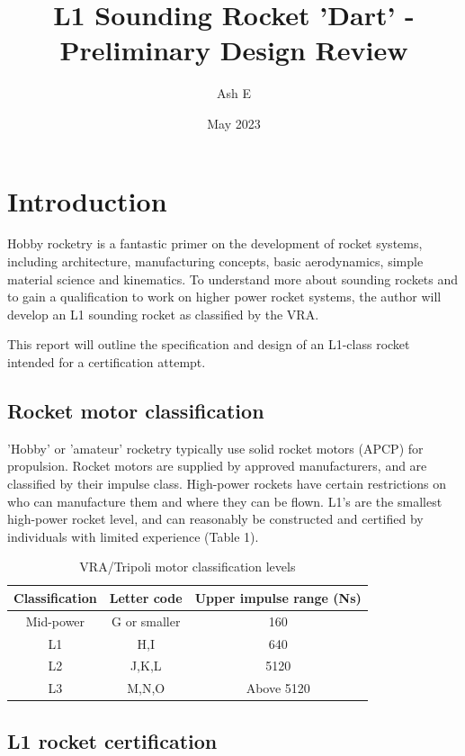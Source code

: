 \documentclass{article}
\title{L1 Sounding Rocket 'Dart' - Preliminary Design Review}
\author{Ash E}
\date{May 2023}
\begin{document}
\maketitle

\section{Introduction}

Hobby rocketry is a fantastic primer on the development of rocket systems, including architecture, manufacturing concepts, basic aerodynamics, simple material science and kinematics. To understand more about sounding rockets and to gain a qualification to work on higher power rocket systems, the author will develop an L1 sounding rocket as classified by the VRA.

This report will outline the specification and design of an L1-class rocket intended for a certification attempt.

\subsection{Rocket motor classification}

'Hobby' or 'amateur' rocketry typically use solid rocket motors (APCP) for propulsion. Rocket motors are supplied by approved manufacturers, and are classified by their impulse class. High-power rockets have certain restrictions on who can manufacture them and where they can be flown. L1's are the smallest high-power rocket level, and can reasonably be constructed and certified by individuals with limited experience (Table 1).

\begin{table}[]
    \centering
    \begin{tabular}{c|c|c}
         Classification & Letter code & Upper impulse range (Ns) \\
         \hline
         Mid-power & G or smaller & 160 \\
         L1 & H,I & 640 \\
         L2 & J,K,L & 5120 \\
         L3 & M,N,O & Above 5120\\
    \end{tabular}
    \caption{VRA/Tripoli motor classification levels}
    \label{tab:my_label}
\end{table}

\subsection{L1 rocket certification}
\end{document}
